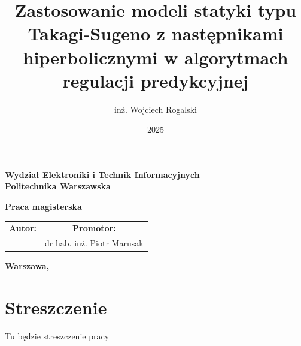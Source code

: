 \documentclass[a4paper,titlepage,11pt,floatssmall]{mwrep}
\begin{document}
\frenchspacing
\pagestyle{uheadings}

\title{\bf Zastosowanie modeli statyki typu Takagi-Sugeno z następnikami hiperbolicznymi w algorytmach regulacji predykcyjnej}
\author{inż. Wojciech Rogalski}
\date{2025}

\makeatletter
\renewcommand{\maketitle}{\begin{titlepage}
\begin{center}{\LARGE {\bf
Wydział Elektroniki i Technik Informacyjnych}}\\
\vspace{0.4cm}
{\LARGE {\bf Politechnika Warszawska}}\\
\vspace{0.3cm}
\end{center}
\vspace{5cm}
\begin{center}
{\bf \LARGE Praca magisterska \vskip 0.1cm}
\end{center}
\vspace{1cm}
\begin{center}
{\bf \LARGE \@title \vskip 0.1cm}
\end{center}
\vspace{2cm}
\begin{center}
\begin{tabular}{@{}c@{\hspace{2cm}}c@{}}
\bf \Large Autor: & \bf \Large Promotor: \\
\@author & dr hab. inż. Piotr Marusak
\end{tabular}
\end{center}
\vspace*{\stretch{6}}
\begin{center}
\bf{\large{Warszawa, \@date\vskip 0.1cm}}
\end{center}
\end{titlepage}
}
\makeatother
\maketitle

\tableofcontents

\chapter{Streszczenie}
Tu będzie streszczenie pracy
\end{document}
